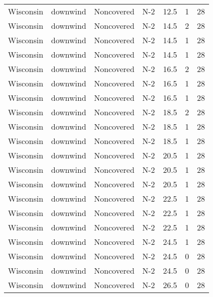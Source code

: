 \documentclass{article}
\begin{document}
\begin{longtable}[c]{ccccccc}
Wisconsin & downwind  & Noncovered & N-2             & 12.5         & 1           & 28  \\
Wisconsin & downwind  & Noncovered & N-2             & 14.5         & 2           & 28  \\
Wisconsin & downwind  & Noncovered & N-2             & 14.5         & 1           & 28  \\
Wisconsin & downwind  & Noncovered & N-2             & 14.5         & 1           & 28  \\
Wisconsin & downwind  & Noncovered & N-2             & 16.5         & 2           & 28  \\
Wisconsin & downwind  & Noncovered & N-2             & 16.5         & 1           & 28  \\
Wisconsin & downwind  & Noncovered & N-2             & 16.5         & 1           & 28  \\
Wisconsin & downwind  & Noncovered & N-2             & 18.5         & 2           & 28  \\
Wisconsin & downwind  & Noncovered & N-2             & 18.5         & 1           & 28  \\
Wisconsin & downwind  & Noncovered & N-2             & 18.5         & 1           & 28  \\
Wisconsin & downwind  & Noncovered & N-2             & 20.5         & 1           & 28  \\
Wisconsin & downwind  & Noncovered & N-2             & 20.5         & 1           & 28  \\
Wisconsin & downwind  & Noncovered & N-2             & 20.5         & 1           & 28  \\
Wisconsin & downwind  & Noncovered & N-2             & 22.5         & 1           & 28  \\
Wisconsin & downwind  & Noncovered & N-2             & 22.5         & 1           & 28  \\
Wisconsin & downwind  & Noncovered & N-2             & 22.5         & 1           & 28  \\
Wisconsin & downwind  & Noncovered & N-2             & 24.5         & 1           & 28  \\
Wisconsin & downwind  & Noncovered & N-2             & 24.5         & 0           & 28  \\
Wisconsin & downwind  & Noncovered & N-2             & 24.5         & 0           & 28  \\
Wisconsin & downwind  & Noncovered & N-2             & 26.5         & 0           & 28  \\

\end{longtable}
\end{document}
